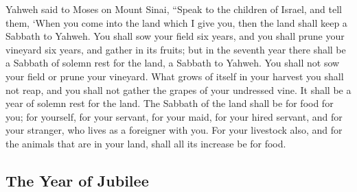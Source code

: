  Yahweh said to Moses on Mount Sinai, 
``Speak to the children of Israel, and tell them, `When you come into
the land which I give you, then the land shall keep a Sabbath to Yahweh.
 You shall sow your field six years, and you shall prune
your vineyard six years, and gather in its fruits;  but in
the seventh year there shall be a Sabbath of solemn rest for the land, a
Sabbath to Yahweh. You shall not sow your field or prune your vineyard.
 What grows of itself in your harvest you shall not reap,
and you shall not gather the grapes of your undressed vine. It shall be
a year of solemn rest for the land.  The Sabbath of the
land shall be for food for you; for yourself, for your servant, for your
maid, for your hired servant, and for your stranger, who lives as a
foreigner with you.  For your livestock also, and for the
animals that are in your land, shall all its increase be for food.

\hypertarget{the-year-of-jubilee}{%
\subsection{The Year of Jubilee}\label{the-year-of-jubilee}}

